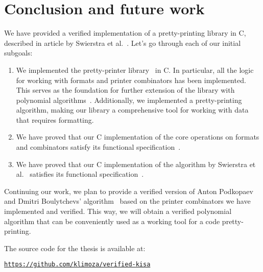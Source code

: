 \documentclass[14pt]{constructor-diploma}
\begin{document}
\section*{Conclusion and future work}
We have provided a verified implementation of a pretty-printing library in C, described in article by 
Swierstra et al.~\cite{swierstra}. Let's go through each of our initial subgoals:
\begin{enumerate}
  \item We implemented the pretty-printer library~\cite{swierstra} in C. 
  In particular, all the logic for working with formats and printer combinators has been implemented. 
  This serves as the foundation for further extension of the library with polynomial algorithms~\cite{podkopaev,bernardy}. 
  Additionally, we implemented a pretty-printing algorithm, making our library a comprehensive tool for working with data that requires formatting.
  \item We have proved that our C implementation of the core operations on formats and combinators
  satisfy its functional specification~\cite{korolihin}.
  \item We have proved that our C implementation of the algorithm by Swierstra et al.~\cite{swierstra}
  satisfies its functional specification~\cite{korolihin}.
\end{enumerate}

Continuing our work, we plan to provide a verified version of Anton Podkopaev and Dmitri Boulytchevs' algorithm~\cite{podkopaev} based on the printer combinators we have implemented and verified. 
This way, we will obtain a verified polynomial algorithm that can be conveniently used as a working tool for a code pretty-printing.

The source code for the thesis is available at:
\begin{center}
    \href{https://github.com/klimoza/verified-kisa}{\texttt{https://github.com/klimoza/verified-kisa}}
\end{center}

\setmonofont[Mapping=tex-text]{CMU Typewriter Text}
% 
% 
\printbibliography
\end{document}

